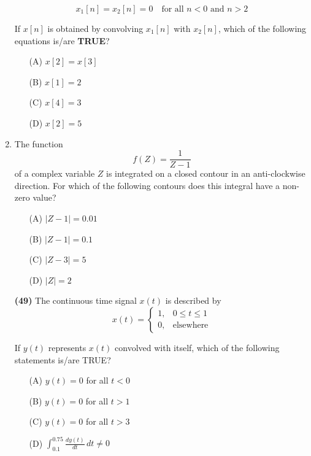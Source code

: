 \documentclass[journal]{IEEEtran}
\begin{document}
\begin{enumerate}
\[
x_1[n] = x_2[n] = 0 \quad \text{for all } n < 0 \text{ and } n > 2
\]

If \( x[n] \) is obtained by convolving \( x_1[n] \) with \( x_2[n] \), which of the following equations is/are \textbf{TRUE}?

\bigskip

\begin{itemize}
    \item[(A)] \( x[2] = x[3] \)
    \item[(B)] \( x[1] = 2 \)
    \item[(C)] \( x[4] = 3 \)
    \item[(D)] \( x[2] = 5 \)
\end{itemize}
\hfill{}

\item 
The function 
\[
f(Z) = \frac{1}{Z - 1}
\]
of a complex variable \( Z \) is integrated on a closed contour in an anti-clockwise direction. For which of the following contours does this integral have a non-zero value?

\bigskip

\begin{itemize}
    \item[(A)] \( |Z - 1| = 0.01 \)
    \item[(B)] \( |Z - 1| = 0.1 \)
    \item[(C)] \( |Z - 3| = 5 \)
    \item[(D)] \( |Z| = 2 \)
\end{itemize}
\hfill{}

\textbf{(49)}
The continuous time signal \( x(t) \) is described by
\[
x(t) = 
\begin{cases}
1, & 0 \le t \le 1 \\
0, & \text{elsewhere}
\end{cases}
\]

If \( y(t) \) represents \( x(t) \) convolved with itself, which of the following statements is/are TRUE?

\begin{itemize}
    \item[(A)] \( y(t) = 0 \) for all \( t < 0 \)
    \item[(B)] \( y(t) = 0 \) for all \( t > 1 \)
    \item[(C)] \( y(t) = 0 \) for all \( t > 3 \)
    \item[(D)] \( \displaystyle \int_{0.1}^{0.75} \frac{dy(t)}{dt} \, dt \ne 0 \)
\end{itemize}
\hfill{}


\end{enumerate}
\end{document}
